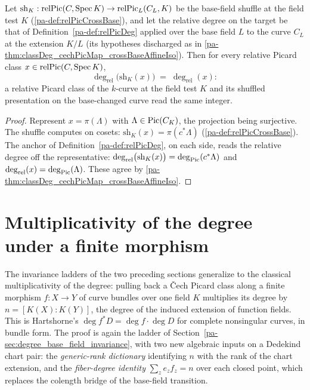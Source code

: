 \begin{theorem}
  \label{pa-thm:relPicDeg_relPicCrossBase}
  \leanok

  Let \(\mathrm{sh}_K : \mathrm{relPic}(C, \operatorname{Spec} K) \to \mathrm{relPic}_L(C_L, K)\)
  be the base-field shuffle at the field test \(K\) (\ref{pa-def:relPicCrossBase}), and
  let the relative degree on the target be that of Definition~\ref{pa-def:relPicDeg}
  applied over the base field \(L\) to the curve \(C_L\) at the extension \(K/L\)
  (its hypotheses discharged as in
  \ref{pa-thm:classDeg_cechPicMap_crossBaseAffineIso}). Then for every relative Picard
  class \(x \in \mathrm{relPic}(C, \operatorname{Spec} K)\),
  \[
    \deg_{\mathrm{rel}}\bigl(\mathrm{sh}_K(x)\bigr) \;=\; \deg_{\mathrm{rel}}(x) :
  \]
  a relative Picard class of the \(k\)-curve at the field test \(K\) and its shuffled
  presentation on the base-changed curve read the same integer.
\end{theorem}
\begin{proof}
  \leanok
  Represent \(x = \pi(\Lambda)\) with \(\Lambda \in \operatorname{Pic}(C_K)\), the projection being
  surjective. The shuffle computes on cosets:
  \(\mathrm{sh}_K(x) = \pi(c^{*}\Lambda)\) (\ref{pa-def:relPicCrossBase}). The anchor of
  Definition~\ref{pa-def:relPicDeg}, on each side, reads the relative degree off the
  representative:
  \(\deg_{\mathrm{rel}}\bigl(\mathrm{sh}_K(x)\bigr) = \deg_{\operatorname{Pic}}(c^{*}\Lambda)\) and
  \(\deg_{\mathrm{rel}}(x) = \deg_{\operatorname{Pic}}(\Lambda)\). These agree by
  \ref{pa-thm:classDeg_cechPicMap_crossBaseAffineIso}.
\end{proof}

\section{Multiplicativity of the degree under a finite morphism}
\label{pa-sec:degree_pullback}

The invariance ladders of the two preceding sections generalize to the classical
multiplicativity of the degree: pulling back a \v Cech Picard class along a finite
morphism \(f : X \to Y\) of curve bundles over one field \(K\) multiplies its degree by
\(n = [K(X) : K(Y)]\), the degree of the induced extension of function fields. This is
Hartshorne's \(\deg f^{*}D = \deg f \cdot \deg D\) for complete nonsingular curves, in
bundle form. The proof is again the ladder of
Section~\ref{pa-sec:degree_base_field_invariance}, with two new algebraic inputs on a
Dedekind chart pair: the \emph{generic-rank dictionary} identifying \(n\) with the rank
of the chart extension, and the \emph{fiber-degree identity}
\(\sum_z e_z f_z = n\) over each closed point, which replaces the colength bridge of the
base-field transition.

